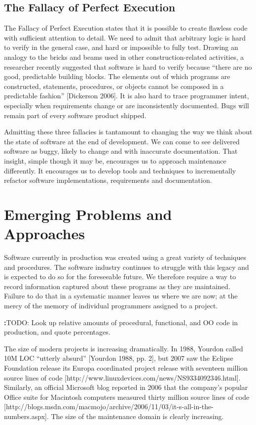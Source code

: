 \subsection{The Fallacy of Perfect Execution}

The Fallacy of Perfect Execution states that it is possible to create flawless code with sufficient attention to detail.  We need to admit that arbitrary logic is hard to verify in the general case, and hard or impossible to fully test.  Drawing an analogy to the bricks and beams used in other construction-related activities, a researcher recently suggested that software is hard to verify because ``there are no good, predictable building blocks.  The elements out of which programs are constructed, statements, procedures, or objects cannot be composed in a predictable fashion'' [Dickerson 2006].  It is also hard to trace programmer intent, especially when requirements change or are inconsistently documented. Bugs will remain part of every software product shipped.

Admitting these three fallacies is tantamount to changing the way we think about the state of software at the end of development.  We can come to see delivered software as buggy, likely to change and with inaccurate documentation.  That insight, simple though it may be, encourages us to approach maintenance differently.  It encourages us to develop tools and techniques to incrementally refactor software implementations, requirements and documentation.


\section{Emerging Problems and Approaches}

Software currently in production was created using a great variety of techniques and procedures.  The software industry continues to struggle with this legacy and is expected to do so for the foreseeable future.  We therefore require a way to record information captured about these programs as they are maintained.  Failure to do that in a systematic manner leaves us where we are now; at the mercy of the memory of individual programmers assigned to a project.

\textbf:{TODO}: Look up relative amounts of procedural, functional, and OO code in production, and quote percentages.

The size of modern projects is increasing dramatically.  In 1988, Yourdon called 10M LOC ``utterly absurd'' [Yourdon 1988, pp. 2], but 2007 saw the Eclipse Foundation release its Europa coordinated project release with seventeen million source lines of code [http://www.linuxdevices.com/news/NS9334092346.html].  Similarly, an official Microsoft blog reported in 2006 that the company's popular Office suite for Macintosh computers measured thirty million source lines of code [http://blogs.msdn.com/macmojo/archive/2006/11/03/it-s-all-in-the-numbers.aspx].  The size of the maintenance domain is clearly increasing.

